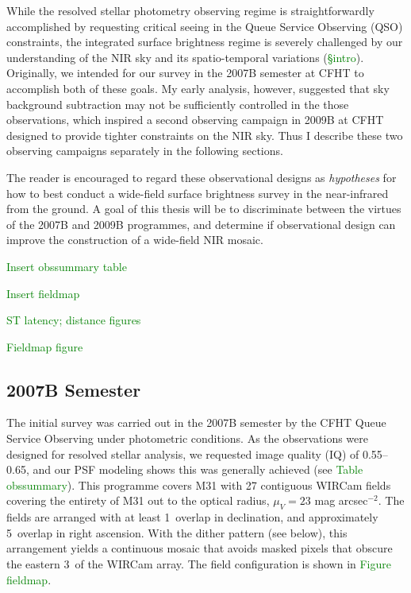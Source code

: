 \documentclass[iop]{emulateapj}
\newcommand{\todo}[1]{\textcolor{green}{#1}}
\begin{document}
While the resolved stellar photometry observing regime is straightforwardly accomplished by requesting critical seeing in the Queue Service Observing (QSO) constraints, the integrated surface brightness regime is severely challenged by our understanding of the NIR sky and its spatio-temporal variations (\todo{\S intro}). Originally, we intended for our survey in the 2007B semester at CFHT to accomplish both of these goals. My early analysis, however, suggested that sky background subtraction may not be sufficiently controlled in the those observations, which inspired a second observing campaign in 2009B at CFHT designed to provide tighter constraints on the NIR sky. Thus I describe these two observing campaigns separately in the following sections.

The reader is encouraged to regard these observational designs as \emph{hypotheses} for how to best conduct a wide-field surface brightness survey in the near-infrared from the ground. A goal of this thesis will be to discriminate between the virtues of the 2007B and 2009B programmes, and determine if observational design can improve the construction of a wide-field NIR mosaic.

\todo{Insert obssummary table}

\todo{Insert fieldmap}

\todo{ST latency; distance figures}

\todo{Fieldmap figure}

\subsection{2007B Semester} %
\label{sec:obs7}

The initial survey was carried out in the 2007B semester by the CFHT Queue Service Observing under photometric conditions. As the observations were designed for resolved stellar analysis, we requested image quality (IQ) of 0.55\arcsec--0.65\arcsec, and our PSF modeling shows this was generally achieved (see \todo{Table obssummary}). This programme covers M31 with 27 contiguous WIRCam fields covering the entirety of M31 out to the optical radius, $\mu_V=23$ mag arcsec$^{-2}$. The fields are arranged with at least 1\arcmin\ overlap in declination, and approximately 5\arcmin\ overlap in right ascension.
With the dither pattern (see below), this arrangement yields a continuous mosaic that avoids masked pixels that obscure the eastern 3\arcmin\ of the WIRCam array. The field configuration is shown in \todo{Figure fieldmap}.
\end{document}
